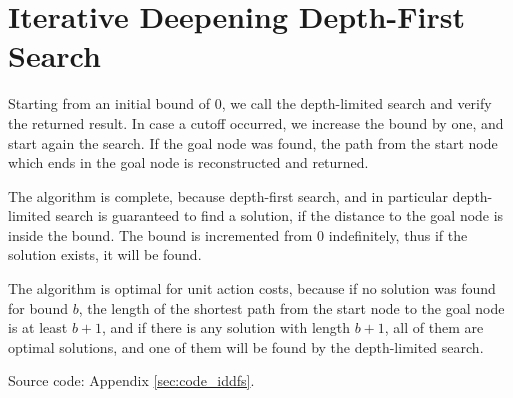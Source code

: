 \section{Iterative Deepening Depth-First Search}
\label{sec:iddfs}

Starting from an initial bound of 0, we call the depth-limited search and verify the returned result. In case a cutoff occurred, we increase the bound by one, and start again the search. If the goal node was found, the path from the start node which ends in the goal node is reconstructed and returned.

The algorithm is complete, because depth-first search, and in particular depth-limited search is guaranteed to find a solution, if the distance to the goal node is inside the bound. The bound is incremented from 0 indefinitely, thus if the solution exists, it will be found. 

The algorithm is optimal for unit action costs, because if no solution was found for bound $b$, the length of the shortest path from the start node to the goal node is at least $b+1$, and if there is any solution with length $b+1$, all of them are optimal solutions, and one of them will be found by the depth-limited search.

Source code: Appendix \ref{sec:code_iddfs}.


